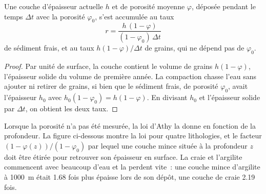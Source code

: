 \begin{proposition}\label{prop:b2:palaeoenvironments:rate}
Une couche d'épaisseur actuelle $h$ et de porosité moyenne $\varphi$, déposée
pendant le temps $\Delta t$ avec la porosité $\varphi_0$, s'est accumulée au taux
\[
  r = \frac{h\,(1 - \varphi)}{(1 - \varphi_0)\,\Delta t}
\]
de sédiment frais, et au taux $h(1-\varphi)/\Delta t$
de grains, qui ne dépend pas de $\varphi_0$.
\end{proposition}

\begin{proof}
Par unité de surface, la couche contient le volume de grains $h(1 - \varphi)$, l'épaisseur solide du
volume de première année. La compaction chasse l'eau sans ajouter ni retirer de grains, si bien que le
sédiment frais, de porosité $\varphi_0$, avait l'épaisseur $h_0$ avec $h_0(1 - \varphi_0) = h(1 -
\varphi)$. En divisant $h_0$ et l'épaisseur solide par $\Delta t$, on obtient les deux taux.
\end{proof}

Lorsque la porosité n'a pas été mesurée, la loi d'Athy la donne en fonction de la profondeur. La figure
ci-dessous montre la loi pour quatre lithologies, et le facteur $(1 - \varphi(z))/(1 - \varphi_0)$ par lequel
une couche mince située à la profondeur $z$ doit être étirée pour retrouver son épaisseur en surface. La
craie et l'argilite commencent avec beaucoup d'eau et la perdent vite~: une couche mince
d'argilite à \qty{1000}{m} était 1.68 fois plus épaisse lors de son dépôt, une couche de craie 2.19 fois.

